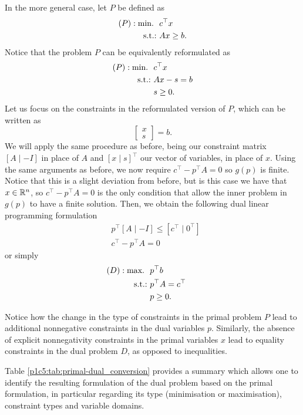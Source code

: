 In the more general case, let $P$ be defined as
%
\begin{align*}
	(P) : \mathop{\text{min.~}} \ & c^\top x \\
	\mathop{\text{s.t.:~}} 	  & Ax \geq b.  
\end{align*}
%
Notice that the problem $P$ can be equivalently reformulated as
%
\begin{align*}
	(P) : \mathop{\text{min.~}} \ & c^\top x \\
	\mathop{\text{s.t.:~}} & Ax - s = b \\
	& s \geq 0.
\end{align*}
%
Let us focus on the constraints in the reformulated version of $P$, which can be written as
%
\begin{equation*}
	[A \mid -I] \begin{bmatrix} x \\ s \end{bmatrix} = b. 
\end{equation*}
%
We will apply the same procedure as before, being our constraint matrix $[A \mid -I]$ in place of $A$ and $[x \mid s]^\top$ our vector of variables, in place of $x$. Using the same arguments as before, we now require $c^\top - p^\top A = 0$ so $g(p)$ is finite. Notice that this is a slight deviation from before, but is this case we have that $x \in \mathbb{R}^n$, so $c^\top - p^\top A = 0$ is the only condition that allow the inner problem in $g(p)$ to have a finite solution. Then, we obtain the following dual linear programming formulation
%
\begin{align*}
	&p^\top [A \mid -I] \leq [c^\top \mid 0^\top]  \\
	&c^\top - p^\top A = 0 
\end{align*}
%
or simply
%
\begin{align*}
	(D) : \mathop{\text{max.~}} \ & p^\top b  \hspace{1.5cm}\\ 
	\mathop{\text{s.t.:~}} & p^\top A = c^\top \\
	& p \geq 0.
\end{align*}

Notice how the change in the type of constraints in the primal problem $P$ lead to additional nonnegative constraints in the dual variables $p$. Similarly, the absence of explicit nonnegativity constraints in the primal variables $x$ lead to equality constraints in the dual problem $D$, as opposed to inequalities. 

Table \ref{p1c5:tab:primal-dual_conversion} provides a summary which allows one to identify the resulting formulation of the dual problem based on the primal formulation, in particular regarding its type (minimisation or maximisation), constraint types and variable domains.

